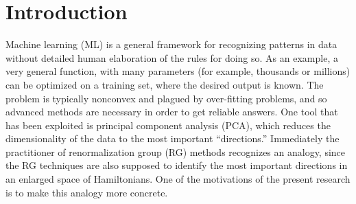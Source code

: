 \documentclass[../main.tex]{subfiles}
\begin{document}
\section{Introduction}%
%
Machine learning (ML) is a general framework for recognizing patterns in data
without detailed human elaboration of the rules for doing so.
%
As an example, a very general function, with many parameters (for example,
thousands or millions) can be optimized on a training set, where the desired
output is known.
%
The problem is typically nonconvex and plagued by over-fitting problems, and so
advanced methods are necessary in order to get reliable answers.
%
One tool that has been exploited is principal component analysis (PCA), which
reduces the dimensionality of the data to the most important ``directions.''
Immediately the practitioner of renormalization group (RG) methods recognizes
an analogy, since the RG techniques are also supposed to identify the most
important directions in an enlarged space of Hamiltonians.
%
One of the motivations of the present research is to make this analogy more
concrete.
\end{document}

